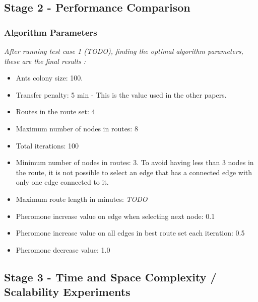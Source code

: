 \subsection{Stage 2 - Performance Comparison}

\subsubsection{Algorithm Parameters}
\emph{\color{red} After running test case 1 (TODO), finding the optimal algorithm parameters, these are the final results :}

\begin{itemize}
\item Ants colony size: 100.
\item Transfer penalty: 5 min - This is the value used in the other papers.
\item Routes in the route set: 4
\item Maximum number of nodes in routes: 8
\item Total iterations: 100
\item Minimum number of nodes in routes: 3. To avoid having less than 3 nodes in the route, it is not possible to select an edge that has a connected edge with only one edge connected to it.
\item Maximum route length in minutes: \emph{\color{red} TODO}
\item Pheromone increase value on edge when selecting next node: 0.1
\item Pheromone increase value on all edges in best route set each iteration: 0.5
\item Pheromone decrease value: 1.0
\end{itemize}

\subsection{Stage 3 - Time and Space Complexity / Scalability Experiments}

